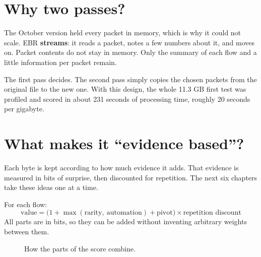 \section{Why two passes?}
The October version held every packet in memory, which is why it could not scale. EBR \textbf{streams}: it reads a packet, notes a few numbers about it, and moves on. Packet contents do not stay in memory. Only the summary of each flow and a little information per packet remain.

The first pass decides. The second pass simply copies the chosen packets from the original file to the new one. With this design, the whole 11.3 GB first test was profiled and scored in about 231 seconds of processing time, roughly 20 seconds per gigabyte.

\section{What makes it ``evidence based''?}
Each byte is kept according to how much evidence it adds. That evidence is measured in bits of surprise, then discounted for repetition. The next six chapters take these ideas one at a time.

\begin{bigidea}
For each flow:
\[
\text{value} = \bigl(1 + \max(\text{rarity},\ \text{automation}) + \text{pivot}\bigr) \times \text{repetition discount}
\]
All parts are in bits, so they can be added without inventing arbitrary weights between them.
\end{bigidea}

\begin{figure}[H]
\centering
{}
\caption{How the parts of the score combine.}
\end{figure}

